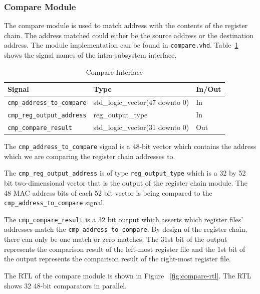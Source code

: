 \documentclass{article}
\begin{document}
\newpage
\subsubsection{Compare Module}

The compare module is used to match address with the contents of the register chain. The address matched could either be the source address or the destination address. The module implementation can be found in \texttt{compare.vhd}. Table~\ref{tab:compare} shows the signal names of the intra-subsystem interface. 


\begin{table}[ht]
    \begin{center}
        \begin{tabular}{lll}\hline
        Signal & Type & In/Out \\
        \hline
        \texttt{cmp\_address\_to\_compare} & std\_logic\_vector(47 downto 0) & In \\
        \hline
        \texttt{cmp\_reg\_output\_address} & reg\_output\_type & In \\
        \hline
        \texttt{cmp\_compare\_result} & std\_logic\_vector(31 downto 0) & Out \\
        \hline
        \end{tabular}
        \caption{Compare Interface}\label{tab:compare}
    \end{center}
\end{table}

The \texttt{cmp\_address\_to\_compare} signal is a 48-bit vector which contains the address which we are comparing the register chain addresses to. 

The \texttt{cmp\_reg\_output\_address} is of type \texttt{reg\_output\_type} which is a 32 by 52 bit two-dimensional vector that is the output of the register chain module. The 48 MAC address bits of each 52 bit vector is being compared to the \texttt{cmp\_address\_to\_compare} signal. 

The \texttt{cmp\_compare\_result} is a 32 bit output which asserts which register files' addresses match the \texttt{cmp\_address\_to\_compare}. By design of the register chain, there can only be one match or zero matches. The 31st bit of the output represents the comparison result of the left-most register file and the 1st bit of the output represents the comparison result of the right-most register file.

The RTL of the compare module is shown in Figure ~\ref{fig:compare-rtl}. The RTL shows 32 48-bit comparators in parallel.
\end{document}
